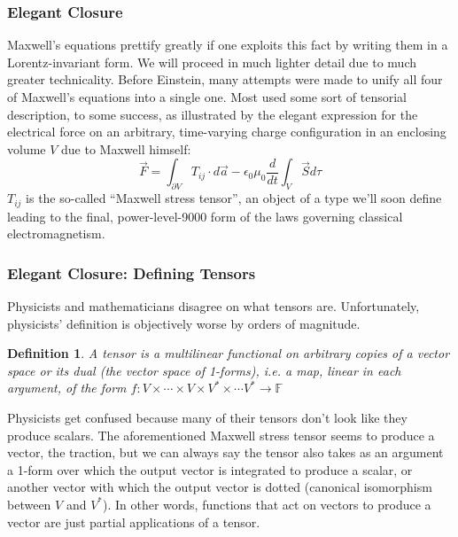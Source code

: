 \documentclass[10pt]{beamer}
\newtheorem{mydef}{Definition}
\begin{document}
\begin{frame}
  \frametitle{Elegant Closure}
  Maxwell's equations prettify greatly if one exploits this fact by writing them in a Lorentz-invariant form.
  We will proceed in much lighter detail due to much greater technicality.
  Before Einstein, many attempts were made to unify all four of Maxwell's equations into a single one.
  Most used some sort of tensorial description, to some success, as illustrated by the elegant expression for the electrical force on an arbitrary, time-varying charge configuration in an enclosing volume $V$ due to Maxwell himself:
  \[
    \vec{F}=\int_{\partial V}T_{ij}\cdot d\vec{a}-\epsilon_{0}\mu_{0}\frac{d}{dt}\int_{V}\vec{S}d\tau
  \]
  $T_{ij}$ is the so-called ``Maxwell stress tensor'', an object of a type we'll soon define leading to the final, power-level-9000 form of the laws governing classical electromagnetism.
\end{frame}

\begin{frame}
  \frametitle{Elegant Closure: Defining Tensors}
  Physicists and mathematicians disagree on what tensors are.
  Unfortunately, physicists' definition is objectively worse by orders of magnitude.
  \begin{mydef}
    \textit{A tensor is a multilinear functional on arbitrary copies of a vector space or its dual  (the vector space of 1-forms), i.e. a map, linear in each argument, of the form} $f:V\times\cdots\times V\times V^{*}\times\cdots V^{*}\to \mathbb{F}$
  \end{mydef}
  Physicists get confused because many of their tensors don't look like they produce scalars.
  The aforementioned Maxwell stress tensor seems to produce a vector, the traction, but we can always say the tensor also takes as an argument a 1-form over which the output vector is integrated to produce a scalar,
  or another vector with which the output vector is dotted (canonical isomorphism between $V$ and $V^{*}$).
  In other words, functions that act on vectors to produce a vector are just partial applications of a tensor.
\end{frame}
\end{document}
